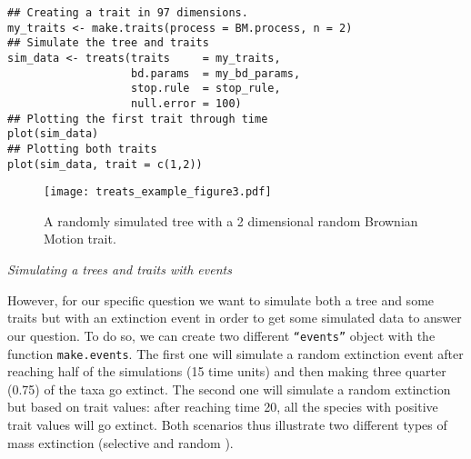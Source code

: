 \documentclass[12pt,letterpaper]{article}
\renewcommand{\subsection}[1]{%
\bigskip
\begin{center}
\begin{large}
\normalfont\itshape #1
\end{large}
\end{center}}
\begin{document}
\begin{lstlisting}
## Creating a trait in 97 dimensions.
my_traits <- make.traits(process = BM.process, n = 2)
## Simulate the tree and traits
sim_data <- treats(traits     = my_traits,
                   bd.params  = my_bd_params,
                   stop.rule  = stop_rule,
                   null.error = 100)
## Plotting the first trait through time
plot(sim_data)
## Plotting both traits
plot(sim_data, trait = c(1,2))
\end{lstlisting}

\begin{figure}[!htbp]
\centering
   \texttt{[image: treats\_example\_figure3.pdf]} 
\caption{A randomly simulated tree with a 2 dimensional random Brownian Motion trait.}
\label{Fig:example3}
\end{figure}

\subsection{Simulating a trees and traits with events}

However, for our specific question we want to simulate both a tree and some traits but with an extinction event in order to get some simulated data to answer our question.
To do so, we can create two different \texttt{``events''} object with the function \texttt{make.events}.
The first one will simulate a random extinction event after reaching half of the simulations (15 time units) and then making three quarter (0.75) of the taxa go extinct.
The second one will simulate a random extinction but based on trait values: after reaching time 20, all the species with positive trait values will go extinct.
Both scenarios thus illustrate two different types of mass extinction (selective and random \citealt{puttick2020complex}).
\end{document}
